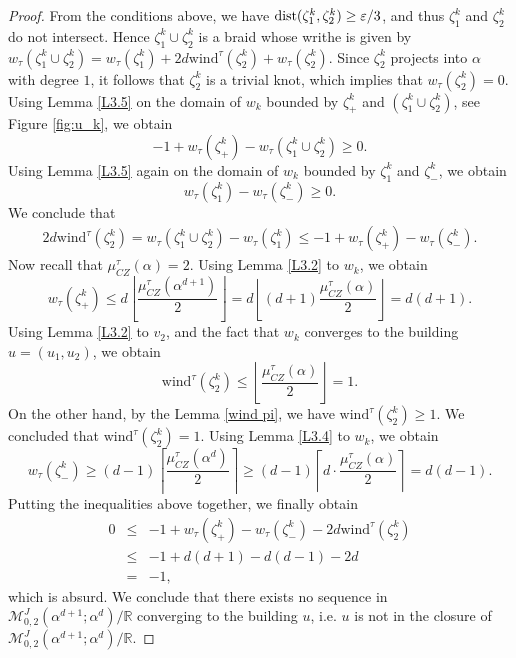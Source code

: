\documentclass{amsart}
\newcommand{\R}{\mathbb{R}}
\newcommand{\M}{\mathcal{M}}
\newcommand{\CZ}{\mu_{CZ}^{\tau}}
\newcommand{\wind}{\text{wind}^{\tau}}
\begin{document}
\begin{proof}
From the conditions above, we have ${\rm dist}(\zeta_1^k,\zeta_2^k) \geq \varepsilon/3$, and thus $\zeta_1^k$ and $\zeta_2^k$ do not intersect. Hence $\zeta_1^k \cup \zeta_2^k$ is a braid whose writhe is given by 
$
w_{\tau}(\zeta_1^k \cup \zeta_2^k)=w_{\tau}(\zeta_1^k)+2d\wind(\zeta_2^k)+w_{\tau}(\zeta_2^k).
$
Since $\zeta_2^k$ projects into $\alpha$ with degree $1$, it follows that $\zeta_2^k$ is a trivial knot, which implies that $w_{\tau}(\zeta_2^k)=0.$
Using Lemma \ref{L3.5} on the domain of $w_k$ bounded by $\zeta_{+}^k$ and $(\zeta_{1}^k \cup \zeta_2^k)$, see Figure \ref{fig:u_k}, we obtain
$$ 
-1+w_{\tau}(\zeta_{+}^k)-w_{\tau}(\zeta_1^k \cup \zeta_2^k) \geq 0.
$$
Using  Lemma \ref{L3.5} again on the domain of $w_k$ bounded by $\zeta_1^k$ and $\zeta_{-}^k$, we obtain
\begin{equation*}
w_{\tau}(\zeta_1^k)-w_{\tau}(\zeta_{-}^k) \geq 0.
\end{equation*}
We conclude that 
\begin{eqnarray*}
2d \wind(\zeta_2^k) =w_{\tau}(\zeta_1^k \cup \zeta_2^k)-w_{\tau}(\zeta_1^k) \leq -1 + w_{\tau}(\zeta_{+}^k)-w_{\tau}(\zeta_{-}^k).
\end{eqnarray*}
Now recall that $\CZ(\alpha)=2$. Using Lemma \ref{L3.2} to $w_k$, we obtain
\begin{equation*}
w_{\tau}(\zeta_{+}^k) \leq d \left\lfloor \frac{\CZ(\alpha^{d+1})}{2}\right\rfloor = d \left\lfloor (d+1)\frac{\CZ(\alpha)}{2}\right\rfloor = d(d+1).
\end{equation*}
Using  Lemma \ref{L3.2} to $v_2$, and the fact that $w_k$ converges to the building $u=(u_1,u_2)$, we obtain
$$\wind(\zeta_2^k) \leq \left\lfloor \frac{\CZ(\alpha)}{2}\right\rfloor = 1.$$
On the other hand, by the Lemma \ref{wind pi}, we have $\wind(\zeta_2^k) \geq 1$. We concluded that $\wind(\zeta_2^k)=1.$
Using Lemma \ref{L3.4} to $w_k$, we obtain
\begin{equation*}
w_{\tau}(\zeta_{-}^k) \geq (d-1)\left\lceil \frac{\CZ(\alpha^d)}{2} \right\rceil \geq (d-1)\left\lceil d \cdot\frac{\CZ(\alpha)}{2} \right\rceil =d(d-1).
\end{equation*}
Putting the inequalities above together, we finally obtain
\begin{eqnarray*}
0 &\leq & -1 + w_{\tau}(\zeta_{+}^k)-w_{\tau}(\zeta_{-}^k)-2d\wind(\zeta_2^k) \\
&\leq & -1 + d(d+1) -d(d-1)-2d\\
&=& -1,
\end{eqnarray*}
which is absurd. We conclude that there exists no sequence in $\M^J_{0,2}(\alpha^{d+1};\alpha^d)/\R$ converging to the building $u$, i.e. $u$ is not in the closure of $\M^J_{0,2}(\alpha^{d+1};\alpha^d)/\R$.
\end{proof}
\end{document}
